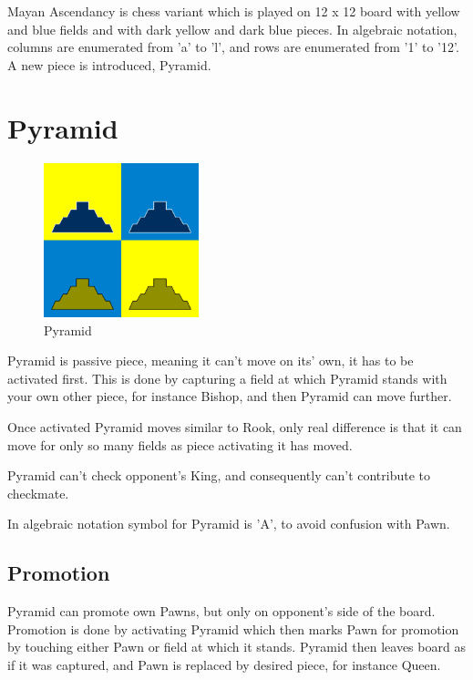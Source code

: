 \documentclass[a5paper,12pt,draft]{book} %
\begin{document}
\noindent
Mayan Ascendancy is chess variant which is played on 12 x 12 board with
yellow and blue fields and with dark yellow and dark blue pieces. In
algebraic notation, columns are enumerated from 'a' to 'l', and rows are
enumerated from '1' to '12'. A new piece is introduced, Pyramid.

\clearpage

\section*{Pyramid}

\noindent
\begin{figure}
\includegraphics[width=0.4\textwidth, keepaspectratio=true]{../gfx/pieces/08_pyramid.png}
\caption{Pyramid}
\label{fig:pyramid}
\end{figure}
Pyramid is passive piece, meaning it can't move on its' own, it has to be
activated first. This is done by capturing a field at which Pyramid stands
with your own other piece, for instance Bishop, and then Pyramid can move
further.

Once activated Pyramid moves similar to Rook, only real difference is that
it can move for only so many fields as piece activating it has moved.

Pyramid can't check opponent's King, and consequently can't contribute to
checkmate.

In algebraic notation symbol for Pyramid is 'A', to avoid confusion with Pawn.

\subsection*{Promotion}

Pyramid can promote own Pawns, but only on opponent's side of the board.
Promotion is done by activating Pyramid which then marks Pawn for promotion
by touching either Pawn or field at which it stands. Pyramid then leaves
board as if it was captured, and Pawn is replaced by desired piece, for
instance Queen.
\end{document}
